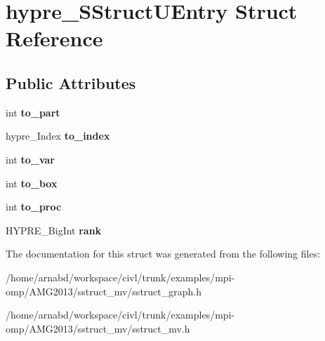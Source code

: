 \hypertarget{structhypre__SStructUEntry}{}\section{hypre\+\_\+\+S\+Struct\+U\+Entry Struct Reference}
\label{structhypre__SStructUEntry}
\subsection*{Public Attributes}
\begin{DoxyCompactItemize}
\item 
\hypertarget{structhypre__SStructUEntry_ada0dc8e2322d0c5721e4c4e594314dd6}{}int {\bfseries to\+\_\+part}\label{structhypre__SStructUEntry_ada0dc8e2322d0c5721e4c4e594314dd6}

\item 
\hypertarget{structhypre__SStructUEntry_af38b8628d663330818ffefc8f7962765}{}hypre\+\_\+\+Index {\bfseries to\+\_\+index}\label{structhypre__SStructUEntry_af38b8628d663330818ffefc8f7962765}

\item 
\hypertarget{structhypre__SStructUEntry_a08110c7bf43d8e75a88f6c356d3588c6}{}int {\bfseries to\+\_\+var}\label{structhypre__SStructUEntry_a08110c7bf43d8e75a88f6c356d3588c6}

\item 
\hypertarget{structhypre__SStructUEntry_a0b77607e7252966d62d213e8460456dd}{}int {\bfseries to\+\_\+box}\label{structhypre__SStructUEntry_a0b77607e7252966d62d213e8460456dd}

\item 
\hypertarget{structhypre__SStructUEntry_af3afe755ad2a692281b3acaab5f075cc}{}int {\bfseries to\+\_\+proc}\label{structhypre__SStructUEntry_af3afe755ad2a692281b3acaab5f075cc}

\item 
\hypertarget{structhypre__SStructUEntry_a0f11927df258e5fd863445ccbb808f8e}{}H\+Y\+P\+R\+E\+\_\+\+Big\+Int {\bfseries rank}\label{structhypre__SStructUEntry_a0f11927df258e5fd863445ccbb808f8e}

\end{DoxyCompactItemize}


The documentation for this struct was generated from the following files\+:\begin{DoxyCompactItemize}
\item 
/home/arnabd/workspace/civl/trunk/examples/mpi-\/omp/\+A\+M\+G2013/sstruct\+\_\+mv/sstruct\+\_\+graph.\+h\item 
/home/arnabd/workspace/civl/trunk/examples/mpi-\/omp/\+A\+M\+G2013/sstruct\+\_\+mv/sstruct\+\_\+mv.\+h\end{DoxyCompactItemize}
